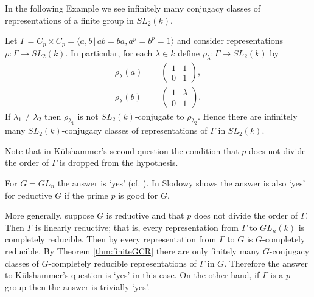 In the following Example we see infinitely many conjugacy classes of representations of a finite group in $SL_2(k)$.
\begin{example}
  Let $\Gamma = C_p \times C_p = \langle a, b \,|\, ab = ba, a^p = b^p = 1 \rangle$ and consider representations $\rho: \Gamma \rightarrow SL_2(k)$. In particular, for each $\lambda \in k$ define $\rho_\lambda: \Gamma \rightarrow SL_2(k)$ by
  \begin{align*}
    \rho_\lambda(a) &= \left( \begin{matrix} 1 & 1 \\ 0 & 1 \end{matrix} \right),\\
    \rho_\lambda(b) &= \left( \begin{matrix} 1 & \lambda \\ 0 & 1 \end{matrix} \right).
  \end{align*}
  If $\lambda_1 \neq \lambda_2$ then $\rho_{\lambda_1}$ is not $SL_2(k)$-conjugate to $\rho_{\lambda_2}$. Hence there are infinitely many $SL_2(k)$-conjugacy classes of representations of $\Gamma$ in $SL_2(k)$.
\end{example}

Note that in K\"ulshammer's second question the condition that $p$ does not divide the order of $\Gamma$ is dropped from the hypothesis.

For $G=GL_n$ the answer is `yes' (cf. \cite[pg. 297]{kulshammer1995donovan}). In \cite{slodowy1997two} Slodowy shows the answer is also `yes' for reductive $G$ if the prime $p$ is good for $G$.


More generally, suppose $G$ is reductive and that $p$ does not divide the order of $\Gamma$. Then $\Gamma$ is linearly reductive; that is, every representation from $\Gamma$ to $GL_n(k)$ is completely reducible. Then by \cite[Lemma 2.6]{bate2005geometric} every representation from $\Gamma$ to $G$ is $G$-completely reducible. By Theorem \ref{thm:finiteGCR} there are only finitely many $G$-conjugacy classes of $G$-completely reducible representations of $\Gamma$ in $G$. Therefore the answer to K\"ulshammer's question is `yes' in this case.
On the other hand, if $\Gamma$ is a $p$-group then the answer is trivially `yes'.

